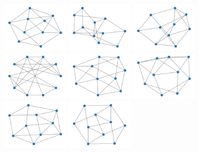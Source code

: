 \includegraphics[width=3.25cm]{images/mfms/f4_20.png}
\includegraphics[width=3.25cm]{images/mfms/f4_21.png}
\includegraphics[width=3.25cm]{images/mfms/f4_22.png}
\includegraphics[width=3.25cm]{images/mfms/f4_23.png}
\includegraphics[width=3.25cm]{images/mfms/f4_24.png}
\includegraphics[width=3.25cm]{images/mfms/f4_25.png}
\includegraphics[width=3.25cm]{images/mfms/f4_26.png}
\includegraphics[width=3.25cm]{images/mfms/f4_27.png}
